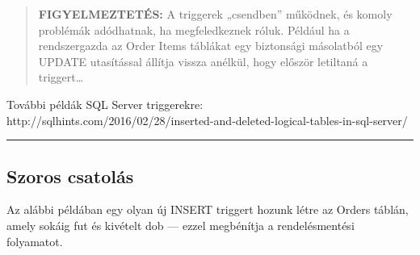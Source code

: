 \documentclass[
  magyar,
]{article}
\begin{document}
\begin{quote}
\textbf{FIGYELMEZTETÉS:} A triggerek „csendben'' működnek, és komoly
problémák adódhatnak, ha megfeledkeznek róluk. Például ha a
rendszergazda az Order Items táblákat egy biztonsági másolatból egy
UPDATE utasítással állítja vissza anélkül, hogy először letiltaná a
triggert\ldots{}
\end{quote}

További példák SQL Server triggerekre:
http://sqlhints.com/2016/02/28/inserted-and-deleted-logical-tables-in-sql-server/

\begin{center}\rule{0.5\linewidth}{0.5pt}\end{center}

\subsection{Szoros csatolás}\label{szoros-csatoluxe1s}

Az alábbi példában egy olyan új INSERT triggert hozunk létre az Orders
táblán, amely sokáig fut és kivételt dob --- ezzel megbénítja a
rendelésmentési folyamatot.
\end{document}
